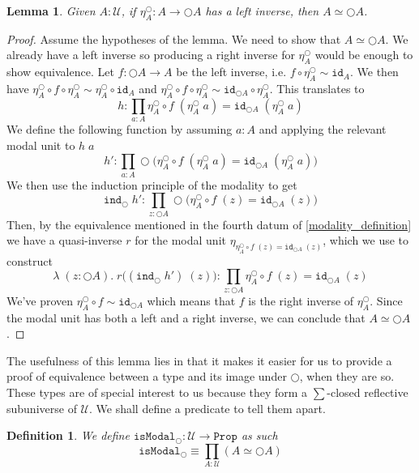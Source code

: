 \documentclass[12pt]{report}
\newtheorem{lem}[thm]{Lemma}
\newtheorem{defn}[thm]{Definition}
\theoremstyle{definition}
\begin{document}
\begin{lem}\label{modalUnitLeftInverse}
Given $A : \mathcal{U}$, if $\eta^\bigcirc_A : A \rightarrow \bigcirc A$ has a left inverse, then $A \simeq \bigcirc A$. 
\end{lem}
\begin{proof}
Assume the hypotheses of the lemma. 
We need to show that $A \simeq \bigcirc A$. 
We already have a left inverse so producing a right inverse for $\eta^\bigcirc_A$ would be enough to show equivalence. 
Let $f : \bigcirc A \rightarrow A$ be the left inverse, i.e. $f \circ \eta^\bigcirc_A \sim \mathtt{id}_A$. 
We then have $\eta^\bigcirc_A \circ f \circ \eta^\bigcirc_A \sim \eta^\bigcirc_A \circ \mathtt{id}_A$ and 
$\eta^\bigcirc_A \circ f \circ \eta^\bigcirc_A \sim \mathtt{id}_{\bigcirc A} \circ \eta^\bigcirc_A$. 
This translates to
$$h : \prod_{a : A}\eta^\bigcirc_A \circ f \;(\eta^\bigcirc_A\; a) = \mathtt{id}_{\bigcirc A} \; (\eta^\bigcirc_A\; a)$$
We define the following function by assuming $a : A$ and applying the relevant modal unit to $h\;a$ 
$$h' : \prod_{a : A}\bigcirc\big(\eta^\bigcirc_A \circ f \;(\eta^\bigcirc_A\; a) = \mathtt{id}_{\bigcirc A} \; (\eta^\bigcirc_A\; a) \big)$$
We then use the induction principle of the modality to get
$$\mathtt{ind}_{\bigcirc}\; h' : \prod_{z : \bigcirc A}\bigcirc\big(\eta^\bigcirc_A \circ f \;(z) = \mathtt{id}_{\bigcirc A} \; (z) \big)$$
Then, by the equivalence mentioned in the fourth datum of \ref{modality_definition} we have a quasi-inverse $r$ for the modal unit $\eta_{\eta^\bigcirc_A \circ f \;(z) = \mathtt{id}_{\bigcirc A} \; (z)}$, 
which we use to construct
$$ \lambda\;(z : \bigcirc A).\; r \big((\mathtt{ind}_{\bigcirc}\; h')\;(z)\big) : \prod_{z : \bigcirc A}\eta^\bigcirc_A \circ f \;(z) = \mathtt{id}_{\bigcirc A} \; (z) $$
We've proven $\eta^\bigcirc_A \circ f \sim \mathtt{id}_{\bigcirc A}$ which means that $ f$ is the right inverse of $\eta_A^\bigcirc$. 
Since the modal unit has both a left and a right inverse, we can conclude that $A \simeq \bigcirc A$. 
\end{proof}
The usefulness of this lemma lies in that it makes it easier for us to provide a proof of equivalence between a type and its image under $\bigcirc$, when they are so. 
These types are of special interest to us because they form a $\sum$-closed reflective subuniverse of $\mathcal{U}$. 
We shall define a predicate to tell them apart. 
\begin{defn}
We define $\mathtt{isModal}_{\bigcirc} : \mathcal{U} \rightarrow \mathtt{Prop}$ as such
$$\mathtt{isModal}_{\bigcirc} \equiv \prod_{A : \mathcal{U}}(A \simeq \bigcirc A)$$
\end{defn}
\end{document}
